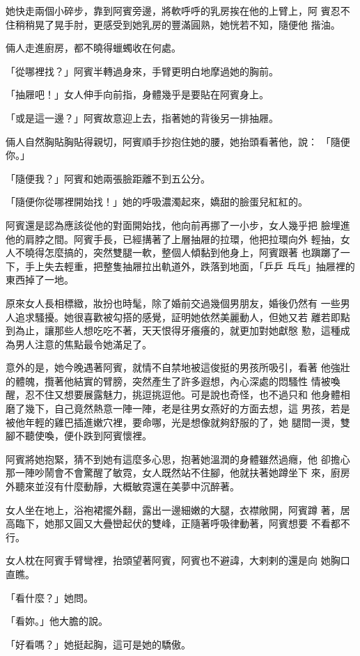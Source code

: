 她快走兩個小碎步，靠到阿賓旁邊，將軟呼呼的乳房挨在他的上臂上，阿
賓忍不住稍稍晃了晃手肘，更感受到她乳房的豐滿圓熟，她恍若不知，隨便他
揩油。

倆人走進廚房，都不曉得蠟蠋收在何處。

「從哪裡找？」阿賓半轉過身來，手臂更明白地摩過她的胸前。

「抽屜吧！」女人伸手向前指，身體幾乎是要貼在阿賓身上。

「或是這一邊？」阿賓故意迎上去，指著她的背後另一排抽屜。

倆人自然胸貼胸貼得親切，阿賓順手抄抱住她的腰，她抬頭看著他，說：
「隨便你。」

「隨便我？」阿賓和她兩張臉距離不到五公分。

「隨便你從哪裡開始找！」她的呼吸濃濁起來，嬌甜的臉蛋兒紅紅的。

阿賓還是認為應該從他的對面開始找，他向前再挪了一小步，女人幾乎把
臉埋進他的肩脖之間。阿賓手長，已經搆著了上層抽屜的拉環，他把拉環向外
輕抽，女人不曉得怎麼搞的，突然雙腿一軟，整個人傾黏到他身上，阿賓跟著
也蹎躑了一下，手上失去輕重，把整隻抽屜拉出軌道外，跌落到地面，「乒乒
乓乓」抽屜裡的東西掉了一地。

原來女人長相標緻，妝扮也時髦，除了婚前交過幾個男朋友，婚後仍然有
一些男人追求騷擾。她很喜歡被勾搭的感覺，証明她依然美麗動人，但她又若
離若即點到為止，讓那些人想吃吃不著，天天恨得牙癢癢的，就更加對她獻慇
懃，這種成為男人注意的焦點最令她滿足了。

意外的是，她今晚遇著阿賓，就情不自禁地被這俊挺的男孩所吸引，看著
他強壯的體魄，攬著他結實的臂膀，突然產生了許多遐想，內心深處的悶騷性
情被喚醒，忍不住又想要展露魅力，挑逗挑逗他。可是說也奇怪，也不過只和
他身體相磨了幾下，自己竟然熱意一陣一陣，老是往男女燕好的方面去想，這
男孩，若是被他年輕的雞巴插進嫩穴裡，要命哪，光是想像就夠舒服的了，她
腿間一燙，雙腳不聽使喚，便仆跌到阿賓懷裡。

阿賓將她抱緊，猜不到她有這麼多心思，抱著她溫潤的身體雖然過癮，他
卻擔心那一陣吵鬧會不會驚醒了敏霓，女人既然站不住腳，他就扶著她蹲坐下
來，廚房外聽來並沒有什麼動靜，大概敏霓還在美夢中沉醉著。

女人坐在地上，浴袍裙擺外翻，露出一邊細嫩的大腿，衣襟敞開，阿賓蹲
著，居高臨下，她那又圓又大疊巒起伏的雙峰，正隨著呼吸律動著，阿賓想要
不看都不行。

女人枕在阿賓手臂彎裡，抬頭望著阿賓，阿賓也不避諱，大剌剌的還是向
她胸口直瞧。

「看什麼？」她問。

「看妳。」他大膽的說。

「好看嗎？」她挺起胸，這可是她的驕傲。

